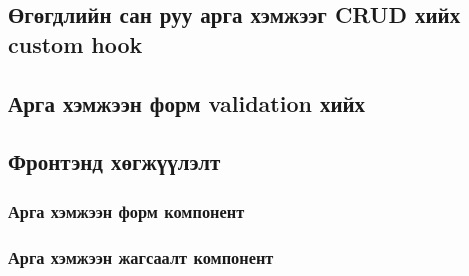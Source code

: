 \subsection{Өгөгдлийн сан руу арга хэмжээг CRUD хийх custom hook}


\subsection{Арга хэмжээн форм validation хийх}


\subsection{Фронтэнд хөгжүүлэлт}
\subsubsection{Арга хэмжээн форм компонент}

\subsubsection{Арга хэмжээн жагсаалт компонент}


